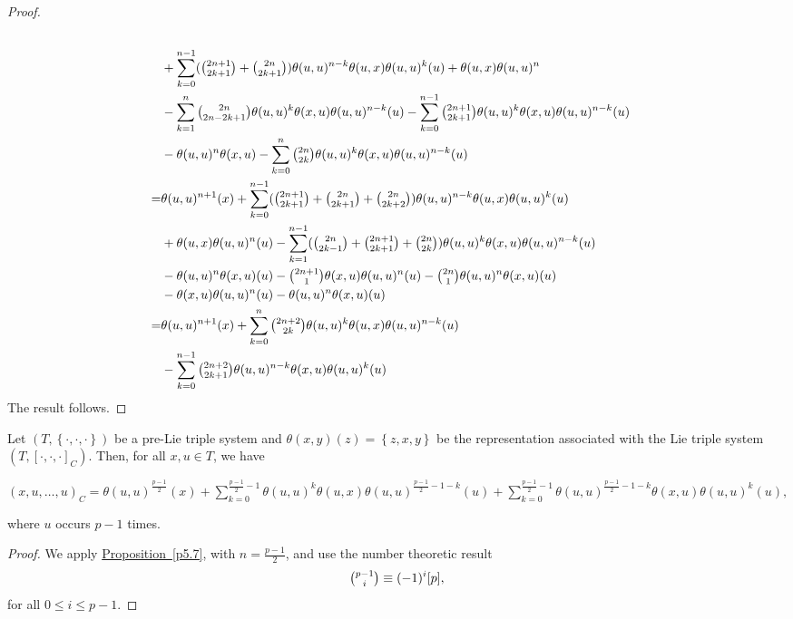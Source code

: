 \documentclass[11pt, twoside]{article}
\begin{document}
\begin{proof}
\begin{align*}
        \\ & + \sum\limits_{k=0}^{n-1}(\tbinom{2n+1}{2k+1}+\tbinom{2n}{2k+1})\theta(u,u)^{n-k}\theta(u,x)\theta(u,u)^k(u) + \theta(u,x)\theta(u,u)^n 
        \\ &- \sum\limits_{k=1}^n\tbinom{2n}{2n-2k+1}\theta(u,u)^k\theta(x,u)\theta(u,u)^{n-k}(u) - \sum\limits_{k=0}^{n-1}\tbinom{2n+1}{2k+1}\theta(u,u)^k\theta(x,u)\theta(u,u)^{n-k}(u)
        \\ &- \theta(u,u)^n\theta(x,u) - \sum\limits_{k=0}^n\tbinom{2n}{2k}\theta(u,u)^k\theta(x,u)\theta(u,u)^{n-k}(u)
        \\ =&\theta(u,u)^{n+1}(x)+ \sum\limits_{k=0}^{n-1}(\tbinom{2n+1}{2k+1}+\tbinom{2n}{2k+1}+\tbinom{2n}{2k+2} )\theta(u,u)^{n-k}\theta(u,x)\theta(u,u)^k(u)\\ & + \theta(u,x)\theta(u,u)^n(u) 
         - \sum\limits_{k=1}^{n-1}(\tbinom{2n}{2k-1}+\tbinom{2n+1}{2k+1}+\tbinom{2n}{2k})\theta(u,u)^k\theta(x,u)\theta(u,u)^{n-k}(u)\\& - \theta(u,u)^n\theta(x,u)(u) 
         - \tbinom{2n+1}{1}\theta(x,u)\theta(u,u)^n(u)-\tbinom{2n}{1}\theta(u,u)^n\theta(x,u)(u) \\&- \theta(x,u)\theta(u,u)^n(u) - \theta(u,u)^n\theta(x,u)(u)
        \\ =& \theta(u,u)^{n+1}(x)+\sum\limits_{k=0}^{n}\tbinom{2n+2}{2k}\theta(u,u)^k\theta(u,x)\theta(u,u)^{n-k}(u) \\ &- \sum\limits_{k=0}^{n-1}\tbinom{2n+2}{2k+1}\theta(u,u)^{n-k}\theta(x,u)\theta(u,u)^k(u)
    \end{align*} The result follows. 
\end{proof}

\begin{cor}\label{c5.8}
     Let $(T,\left\{ \cdot,\cdot,\cdot\right\}) $ be a pre-Lie triple system and  $\theta(x,y)(z)= \left\{ z,x,y\right\} $ be the representation associated with the Lie triple system $(T,[\cdot,\cdot,\cdot]_C) $. Then,  for all $x,u\in T$,  we have \begin{center}
         $(x,u,\ldots,u)_C= \theta(u,u)^{\frac{p-1}{2}}(x) + \sum\limits_{k=0}^{\frac{p-1}{2}-1}\theta(u,u)^k\theta(u,x)\theta(u,u)^{\frac{p-1}{2}-1-k}(u) + \sum\limits_{k=0}^{\frac{p-1}{2}-1}\theta(u,u)^{\frac{p-1}{2}-1-k}\theta(x,u)\theta(u,u)^k(u) ,$
     \end{center} where $u$ occurs $p-1$ times.
\end{cor}

\begin{proof}
    We apply  \hyperref[p5.7]{Proposition~\ref*{p5.7}}, with $n= \frac{p-1}{2}$, and use the number theoretic result $$\tbinom{p-1}{i}\equiv (-1)^i[p], $$ for all $ 0\leq i\leq p-1$.
\end{proof}
\end{document}

